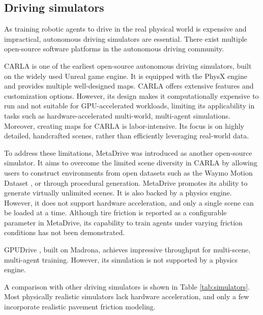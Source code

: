 \subsection{Driving simulators}
As training robotic agents to drive in the real physical world is expensive and impractical, autonomous driving simulators are essential. There exist multiple open-source software platforms in the autonomous driving community.

CARLA \cite{Dosovitskiy17} is one of the earliest open-source autonomous driving simulators, built on the widely used Unreal game engine. It is equipped with the PhysX engine and provides multiple well-designed maps. CARLA offers extensive features and customization options. However, its design makes it computationally expensive to run and not suitable for GPU-accelerated workloads, limiting its applicability in tasks such as hardware-accelerated multi-world, multi-agent simulations. Moreover, creating maps for CARLA is labor-intensive. Its focus is on highly detailed, handcrafted scenes, rather than efficiently leveraging real-world data.

To address these limitations, MetaDrive \cite{li2022metadrive} was introduced as another open-source simulator. It aims to overcome the limited scene diversity in CARLA by allowing users to construct environments from open datasets such as the Waymo Motion Dataset \cite{Kan_2024_icra}, or through procedural generation. MetaDrive promotes its ability to generate virtually unlimited scenes. It is also backed by a physics engine. However, it does not support hardware acceleration, and only a single scene can be loaded at a time. Although tire friction is reported as a configurable parameter in MetaDrive, its capability to train agents under varying friction conditions has not been demonstrated.

GPUDrive \cite{kazemkhani_gpudrive_2025}, built on Madrona, achieves impressive throughput for multi-scene, multi-agent training. However, its simulation is not supported by a physics engine.

A comparison with other driving simulators is shown in Table \ref{tab:simulators}. Most physically realistic simulators lack hardware acceleration, and only a few incorporate realistic pavement friction modeling.


